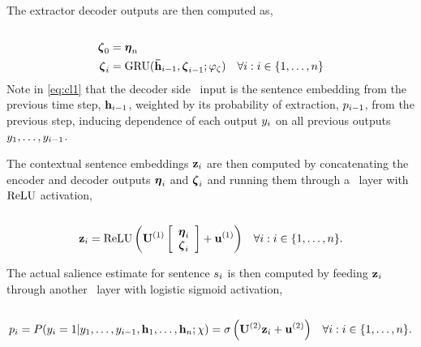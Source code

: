 The extractor decoder outputs are then computed as,\\

\\[-40pt]
\begin{align}
    \boldsymbol{\zeta}_0  &= \boldsymbol{\eta}_n  \\
   \boldsymbol{\zeta}_i &= \operatorname{GRU}(\boldsymbol{\bar{\mathbf{h}}}_{i-1}, \boldsymbol{\zeta}_{i-1};\varphi_\zeta)
   &  
    \forall i : i \in \{1,\ldots,n\}  \label{eq:cl1} 
\end{align}
Note in \autoref{eq:cl1} that the decoder side \gru~input is the sentence
embedding from the previous time step, $\mathbf{h}_{i-1}$, weighted by its
probability of extraction, $p_{i-1}$, from the previous step, inducing
dependence of each output $y_i$ on all previous outputs
$y_1,\ldots,y_{i-1}$.

The contextual sentence embeddings $\mathbf{z}_i$ are then computed by
concatenating the encoder and decoder outputs $\boldsymbol{\eta}_i$ and $\boldsymbol{\zeta}_i$ and
running them through a \feedforward~layer with $\operatorname{ReLU}$ activation,\\

\\[-30pt]
\begin{align}
\mathbf{z}_i &= \operatorname{ReLU}\left(\mathbf{U}^{(1)} \left[\begin{array}{c}\boldsymbol{\eta}_i \\ \boldsymbol{\zeta}_i \end{array}\right] + \mathbf{u}^{(1)} \right) & 
    \forall i : i \in \{1,\ldots,n\}.
\end{align}

The actual salience estimate for sentence $s_i$ is then computed by feeding
$\mathbf{z}_i$ through another \feedforward~layer with logistic sigmoid
activation,\\

\\[-40pt]
\begin{align}
 p_i = P(y_i =1|y_1,\ldots,y_{i-1}, \mathbf{h}_1,\ldots,\mathbf{h}_n; \chi) &= \sigma\left(\mathbf{U}^{(2)}\mathbf{z}_i + \mathbf{u}^{(2)}  \right) & 
    \forall i : i \in \{1,\ldots,n\}. 
\end{align}

